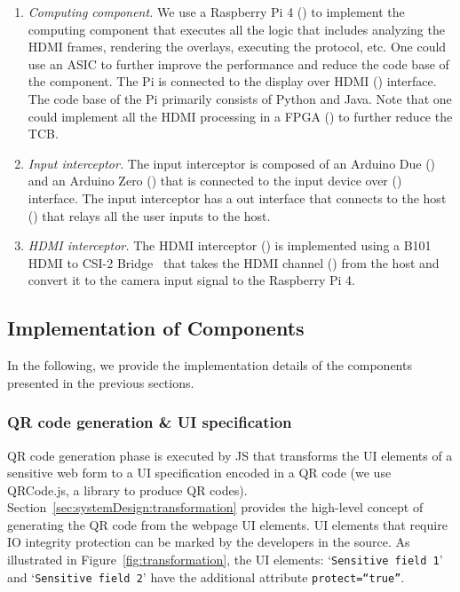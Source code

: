 \begin{enumerate}
 
  \item \emph{Computing component.} We use a Raspberry Pi 4 (\six) to implement the computing component that executes all the \device logic that includes analyzing the HDMI frames, rendering the overlays, executing the \tls protocol, etc. One could use an ASIC to further improve the performance and reduce the code base of the component. The Pi is connected to the display over HDMI (\nine) interface. The code base of the Pi primarily consists of Python and Java. Note that one could implement all the HDMI processing in a FPGA () to further reduce the TCB.
  
  \item \emph{Input interceptor.} The input interceptor is composed of an Arduino Due (\three) and an Arduino Zero (\four) that is connected to the input device over \usb (\two) interface. The input interceptor has a \usb out interface that connects to the host (\five) that relays all the user inputs to the host. 

  \item \emph{HDMI interceptor.} The HDMI interceptor (\seven) is implemented using a B101 HDMI to CSI-2 Bridge~\cite{b101} that takes the HDMI channel (\eight) from the host and convert it to the camera input signal to the Raspberry Pi 4.  
 
\end{enumerate}

\subsection{Implementation of \name Components}
\label{appendix:implementation}


In the following, we provide the implementation details of the \name components presented in the previous sections. 

\subsubsection{QR code generation \& UI specification}
\label{sec:prototype:impl:qr}
%
QR code generation phase is executed by \name JS that transforms the UI elements of a sensitive web form to a UI specification encoded in a QR code (we use QRCode.js, a \js library to produce QR codes). Section~\ref{sec:systemDesign:transformation} provides the high-level concept of generating the QR code from the webpage UI elements. UI elements that require IO integrity protection can be marked by the developers in the \html source. As illustrated in Figure~\ref{fig:transformation}, the \html UI elements: `\texttt{Sensitive field 1}' and `\texttt{Sensitive field 2}' have the additional attribute \texttt{protect=``true''}. %

